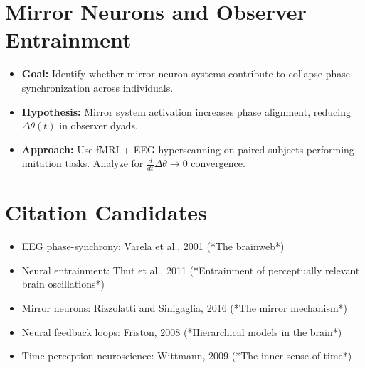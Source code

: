 \section{Mirror Neurons and Observer Entrainment}

\begin{itemize}
  \item \textbf{Goal:} Identify whether mirror neuron systems contribute to collapse-phase synchronization across individuals.
  \item \textbf{Hypothesis:} Mirror system activation increases phase alignment, reducing $\Delta\theta(t)$ in observer dyads.
  \item \textbf{Approach:} Use fMRI + EEG hyperscanning on paired subjects performing imitation tasks. Analyze for $\frac{d}{dt} \Delta\theta \rightarrow 0$ convergence.
\end{itemize}

\section{Citation Candidates}

\begin{itemize}
  \item EEG phase-synchrony: Varela et al., 2001 (*The brainweb*)
  \item Neural entrainment: Thut et al., 2011 (*Entrainment of perceptually relevant brain oscillations*)
  \item Mirror neurons: Rizzolatti and Sinigaglia, 2016 (*The mirror mechanism*)
  \item Neural feedback loops: Friston, 2008 (*Hierarchical models in the brain*)
  \item Time perception neuroscience: Wittmann, 2009 (*The inner sense of time*)
\end{itemize}
